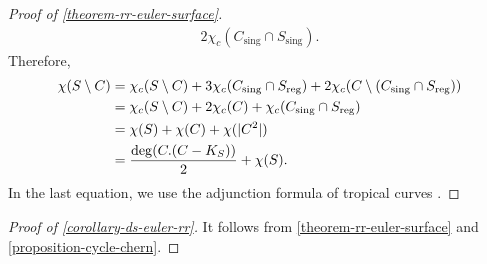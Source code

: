 \documentclass[a4paper,dvipdfmx,reqno,12pt]{amsart}
\theoremstyle{definition}
\newcommand{\opn}[1]{\operatorname{#1}}
\numberwithin{equation}{section}
\begin{document}
\begin{proof}[{Proof of \cref{theorem-rr-euler-surface}}]
\begin{align}
2\chi_c(C_{\mathrm{sing}}\cap S_{\mathrm{sing}}).
\end{align}
Therefore, 
\begin{align}
\label{equation-euler-calculus}
\chi(S\setminus C)&=
\chi_c(S\setminus C)+
3\chi_c(C_{\mathrm{sing}}
\cap S_{\mathrm{reg}})+
2\chi_c(C\setminus (C_{\mathrm{sing}}
\cap S_{\mathrm{reg}}))\\
&=\chi_c(S\setminus C)+2\chi_c(C)+
\chi_c(C_{\mathrm{sing}}
\cap S_{\mathrm{reg}}) \notag \\
&=\chi(S)+\chi(C)+\chi(|C^2|) 
\label{equation-iterated-euler} \\
&=\frac{\opn{deg}(C. (C-K_S))}{2}+\chi(S). \notag
\end{align}
In the last equation, we use the adjunction formula of tropical
curves \cite[Theorem 4.11]{shaw2015tropical}.
\end{proof}


\begin{proof}[{Proof of \cref{corollary-ds-euler-rr}}]
It follows from
\cref{theorem-rr-euler-surface} and
\cref{proposition-cycle-chern}.
\end{proof}
\end{document}
